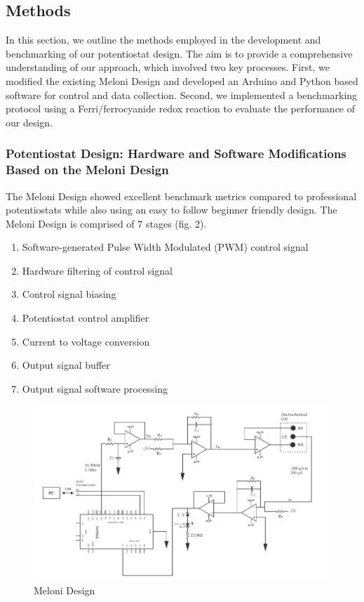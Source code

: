 \documentclass{article}
\begin{document}
\subsection*{Methods}

In this section, we outline the methods employed in the development and benchmarking of our potentiostat design. The aim is to provide a comprehensive understanding of our approach, which involved two key processes. First, we modified the existing Meloni Design and developed an Arduino and Python based software for control and data collection. Second, we implemented a benchmarking protocol using a Ferri/ferrocyanide redox reaction to evaluate the performance of our design. 

\subsubsection*{Potentiostat Design: Hardware and Software Modifications Based on the Meloni Design}

The Meloni Design showed excellent benchmark metrics compared to professional potentiostats while also using an easy to follow beginner friendly design. The Meloni Design is comprised of 7 stages (fig. 2).
\begin{enumerate}
    \item Software-generated Pulse Width Modulated (PWM) control signal
    \item Hardware filtering of control signal
    \item Control signal biasing
    \item Potentiostat control amplifier
    \item Current to voltage conversion
    \item Output signal buffer
    \item Output signal software processing
\end{enumerate}

\begin{figure}[H]
    \centering
    \includegraphics[width=.9\linewidth]{meloni_design.png}
    \caption{Meloni Design}
\end{figure}
\end{document}
